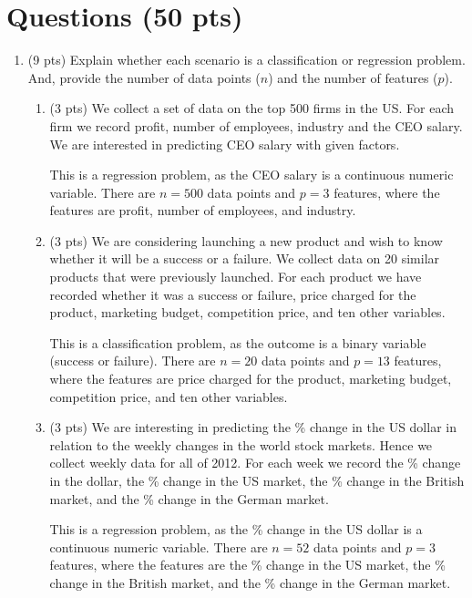 \documentclass[a4paper]{article}
\theoremstyle{definition}
\newenvironment{soln}{
    \leavevmode\color{blue}\ignorespaces
}{}
\begin{document}
\section{Questions (50 pts)}
\begin{enumerate}
\item (9 pts) Explain whether each scenario is a classification or regression problem. And, provide the number of data points ($n$) and the number of features ($p$).

\begin{enumerate}
	\item (3 pts) We collect a set of data on the top 500 firms in the US. For each firm we record profit, number of employees, industry and the CEO salary. We are interested in predicting CEO salary with given factors.
	
	\begin{soln} 
		This is a regression problem, as the CEO salary is a continuous numeric variable. There are $n=500$ data points and $p=3$ features, where the features are profit, number of employees, and industry. 
	\end{soln}
	
	\item (3 pts) We are considering launching a new product and wish to know whether it will be a success or a failure. We collect data on 20 similar products that were previously launched. For each product we have recorded whether it was a success or failure, price charged for the product, marketing budget, competition price, and ten other variables.
	
	\begin{soln}
		This is a classification problem, as the outcome is a binary variable (success or failure). There are $n=20$ data points and $p=13$ features, where the features are price charged for the product, marketing budget, competition price, and ten other variables.
	\end{soln}
	
	\item (3 pts) We are interesting in predicting the \% change in the US dollar in relation to the weekly changes in the world stock markets. Hence we collect weekly data for all of 2012. For each week we record the \% change in the dollar, the \% change in the US market, the \% change in the British market, and the \% change in the German market.
	
	\begin{soln}
		This is a regression problem, as the \% change in the US dollar is a continuous numeric variable. There are $n=52$ data points and $p=3$ features, where the features are the \% change in the US market, the \% change in the British market, and the \% change in the German market.
	\end{soln}
	

\end{enumerate}
\end{enumerate}
\end{document}
